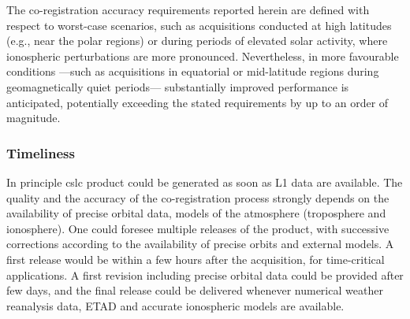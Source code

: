 The co-registration accuracy requirements reported herein are defined with respect to worst-case scenarios, such as acquisitions conducted at high latitudes (e.g., near the polar regions) or during periods of elevated solar activity, where ionospheric perturbations are more pronounced. Nevertheless, in more favourable conditions —such as acquisitions in equatorial or mid-latitude regions during geomagnetically quiet periods— substantially improved performance is anticipated, potentially exceeding the stated requirements by up to an order of magnitude.

\subsubsection{Timeliness}
\label{sec:cslc_timeliness}

In principle \acs{cslc} product could be generated as soon as L1 data are available. The quality and the accuracy of the co-registration process strongly depends on the availability of precise orbital data, models of the atmosphere (troposphere and ionosphere). One could foresee multiple releases of the product, with successive corrections according to the availability of precise orbits and external models. A first release would be within a few hours after the acquisition, for time-critical applications. A first revision including precise orbital data could be provided after few days, and the final release could be delivered whenever numerical weather reanalysis data, ETAD and accurate ionospheric models are available.

